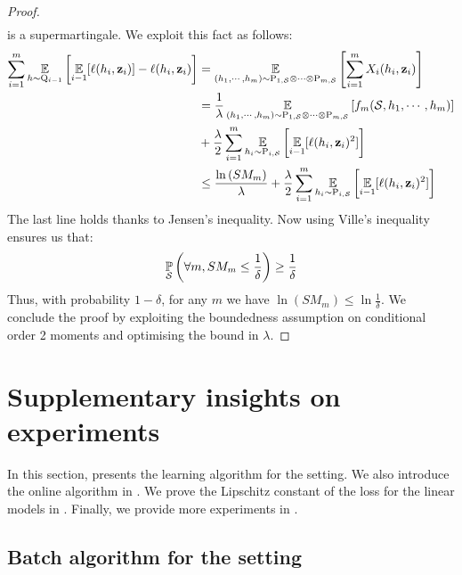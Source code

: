 \begin{noaddcontents}
\begin{proof}
\begin{align*}
        \end{align*}
        is a supermartingale. 
        We exploit this fact as follows:
        \begin{align*}
            \sum_{i=1}^{m}\operatorname*{\mathbb{E}}_{h\sim\mathrm{Q}_{i-1}}\left[\operatorname*{\mathbb{E}}_{i-1}[\ell(h_i,\mathbf{z}_i)]-\ell(h_i, \mathbf{z}_i)\right] &= \operatorname*{\mathbb{E}}_{(h_1,\cdots,h_m) \sim \mathrm{P}_{1,\mathcal{S}} \otimes \cdots \otimes \mathrm{P}_{m,\mathcal{S}}} \left[\sum_{i=1}^m X_i(h_i,\mathbf{z}_i)\right] \\
            & = \frac{1}{\lambda}\operatorname*{\mathbb{E}}_{(h_1,\cdots,h_m) \sim \mathrm{P}_{1,\mathcal{S}} \otimes \cdots \otimes \mathrm{P}_{m,\mathcal{S}}} \left[ f_m (\mathcal{S},h_1,\cdots,h_m)\right] \\
            & + \frac{\lambda}{2} \sum_{i=1}^m \operatorname*{\mathbb{E}}_{h_i\sim \mathrm{P}_{i,\mathcal{S}}}\left[ \operatorname*{\mathbb{E}}_{i-1}[\ell(h_i, \mathbf{z}_i)^2] \right] \\
            & \leq \frac{\ln\left( SM_m \right)}{\lambda} + \frac{\lambda}{2} \sum_{i=1}^m \operatorname*{\mathbb{E}}_{h_i\sim \mathrm{P}_{i,\mathcal{S}}}\left[ \operatorname*{\mathbb{E}}_{i-1}[\ell(h_i, \mathbf{z}_i)^2] \right]
        \end{align*}
        The last line holds thanks to Jensen's inequality.
        Now using Ville's inequality ensures us that:
        \begin{align*}
        \operatorname*{\mathbb{P}}_{\mathcal{S}}\left( \forall m, SM_m \leq \frac{1}{\delta} \right) \geq \frac{1}{\delta}
        \end{align*}
        Thus, with probability $1{-}\delta$, for any $m$ we have $\ln(SM_m){\leq}\ln\frac{1}{\delta}$. 
        We conclude the proof by exploiting the boundedness assumption on conditional order 2 moments and optimising the bound in $\lambda$. 
    \end{proof}
    
    \section{Supplementary insights on experiments}
    \label{sec:supplementary-expes}
    
    In this section,  presents the learning algorithm for the \iid setting.
    We also introduce the online algorithm in .
    We prove the Lipschitz constant of the loss for the linear models in .
    Finally, we provide more experiments in .
    
    \subsection{Batch algorithm for the \iid setting}
    \label{sec:alg-batch}
    

\end{noaddcontents}
